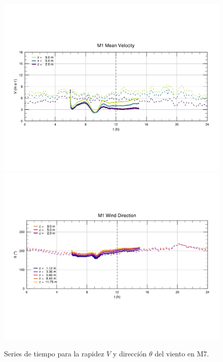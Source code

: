 \begin{figure}[H]
	\centering
	\includegraphics[width=0.87\linewidth,page=7,trim={9mm 57mm 10mm 60mm},clip]{Imagenes/06/bol/ts_interpol_compare.pdf}\\%
	\includegraphics[width=0.87\linewidth,page=7,trim={12mm 52mm 10mm 60mm},clip]{Imagenes/06/bol/ts_interpol_compare_o.pdf}%
	\vspace{-2mm}\caption{Series de tiempo para la rapidez $V$ y dirección $\theta$ del viento en M7.}
	\label{fig:06_bol_ts_m7}
\end{figure}
\vspace*{\fill}
